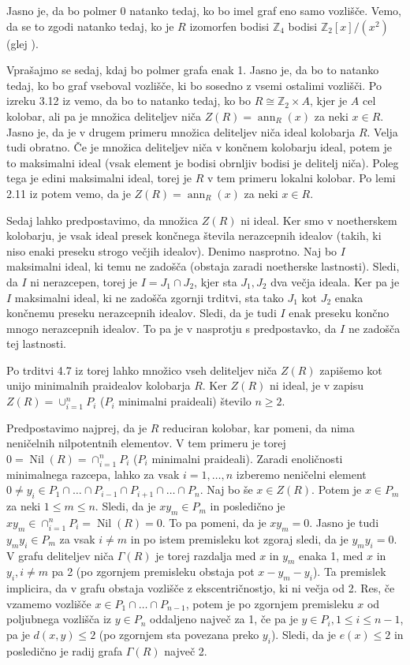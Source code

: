 \documentclass[a4paper, 12pt]{amsart}
\theoremstyle{definition} %
\theoremstyle{plain} %
\newcommand{\Z}{\mathbb Z}
\DeclareMathOperator{\ann}{ann}
\DeclareMathOperator{\nil}{Nil}
\begin{document}
Jasno je, da bo polmer 0 natanko tedaj, ko bo imel graf eno samo vozlišče. Vemo, da se to zgodi natanko tedaj, ko je $R$ izomorfen bodisi $\Z_4$ bodisi $\Z_2[x]/(x^2)$ (glej \cite{Anderson-klasifikacijaMalihGrafov}).

Vprašajmo se sedaj, kdaj bo polmer grafa enak 1. Jasno je, da bo to natanko tedaj, ko bo graf vseboval vozlišče, ki bo sosedno z vsemi ostalimi vozlišči. Po izreku 3.12 iz \cite{diploma} vemo, da bo to natanko tedaj, ko bo $R\cong \Z_2 \times A$, kjer je $A$ cel kolobar, ali pa je množica deliteljev niča $Z(R) = \ann_R(x)$ za neki $x\in R$. Jasno je, da je v drugem primeru množica deliteljev niča ideal kolobarja $R$. Velja tudi obratno. Če je množica deliteljev niča v končnem kolobarju ideal, potem je to maksimalni ideal (vsak element je bodisi obrnljiv bodisi je delitelj niča). Poleg tega je edini maksimalni ideal, torej je $R$ v tem primeru lokalni kolobar. Po lemi 2.11 iz \cite{diploma} potem vemo, da je $Z(R)=\ann_R(x)$ za neki $x\in R$. 

Sedaj lahko predpostavimo, da množica $Z(R)$ ni ideal. Ker smo v noetherskem kolobarju, je vsak ideal presek končnega števila nerazcepnih idealov (takih, ki niso enaki preseku strogo večjih idealov). Denimo nasprotno. Naj bo $I$ maksimalni ideal, ki temu ne zadošča (obstaja zaradi noetherske lastnosti). Sledi, da $I$ ni nerazcepen, torej je $I=J_1\cap J_2$, kjer sta $J_1,J_2$ dva večja ideala. Ker pa je $I$ maksimalni ideal, ki ne zadošča zgornji trditvi, sta tako $J_1$ kot $J_2$ enaka končnemu preseku nerazcepnih idealov. Sledi, da je tudi $I$ enak preseku končno mnogo nerazcepnih idealov. To pa je v nasprotju s predpostavko, da $I$ ne zadošča tej lastnosti.

Po trditvi 4.7 iz \cite{Atiyah} torej lahko množico vseh deliteljev niča $Z(R)$ zapišemo kot unijo minimalnih praidealov kolobarja $R$. Ker $Z(R)$ ni ideal, je v zapisu $Z(R) = \cup_{i=1}^n P_i$ ($P_i$ minimalni praideali) število $n\ge2$.


Predpostavimo najprej, da je $R$ reduciran kolobar, kar pomeni, da nima neničelnih nilpotentnih elementov. V tem primeru je torej $0=\nil(R)=\cap_{i=1}^n P_i$ ($P_i$ minimalni praideali). Zaradi enoličnosti minimalnega razcepa, lahko za vsak $i=1,\dots,n$ izberemo neničelni element $0\neq y_i\in P_1 \cap\dots \cap P_{i-1}\cap P_{i+1}\cap\dots \cap P_n$. Naj bo še $x\in Z(R)$. Potem je $x\in P_m$ za neki $1\le m \le n$. Sledi, da je $xy_m\in P_m$ in posledično je $xy_m \in \cap_{i=1}^n P_i = \nil(R) = 0$. To pa pomeni, da je $xy_m = 0$. Jasno je tudi $y_m y_i\in P_m$ za vsak $i\neq m$ in po istem premisleku kot zgoraj sledi, da je $y_m y_i = 0$. V grafu deliteljev niča $\Gamma(R)$ je torej razdalja med $x$ in $y_m$ enaka 1, med $x$ in $y_i, i\neq m$ pa 2 (po zgornjem premisleku obstaja pot $x-y_m-y_i$). Ta premislek implicira, da v grafu obstaja vozlišče z ekscentričnostjo, ki ni večja od 2. Res, če vzamemo vozlišče $x\in P_1\cap \dots \cap P_{n-1}$, potem je po zgornjem premisleku $x$ od poljubnega vozlišča iz $y \in P_n$ oddaljeno največ za 1, če pa je $y\in P_i, 1 \le i \le n-1$, pa je $d(x,y) \le 2$ (po zgornjem sta povezana preko $y_i$). Sledi, da je $e(x) \le 2$ in posledično je radij grafa $\Gamma(R)$ največ 2.
\end{document}
